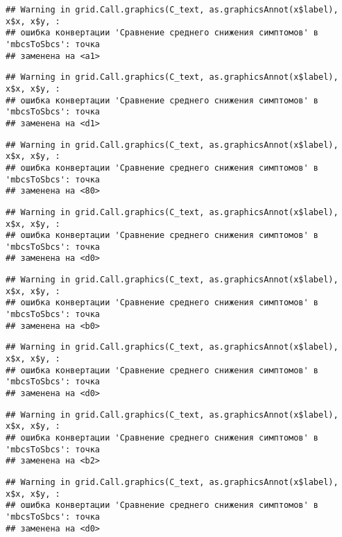 \documentclass[
]{article}
\begin{document}
\begin{verbatim}
## Warning in grid.Call.graphics(C_text, as.graphicsAnnot(x$label), x$x, x$y, :
## ошибка конвертации 'Сравнение среднего снижения симптомов' в 'mbcsToSbcs': точка
## заменена на <a1>
\end{verbatim}

\begin{verbatim}
## Warning in grid.Call.graphics(C_text, as.graphicsAnnot(x$label), x$x, x$y, :
## ошибка конвертации 'Сравнение среднего снижения симптомов' в 'mbcsToSbcs': точка
## заменена на <d1>
\end{verbatim}

\begin{verbatim}
## Warning in grid.Call.graphics(C_text, as.graphicsAnnot(x$label), x$x, x$y, :
## ошибка конвертации 'Сравнение среднего снижения симптомов' в 'mbcsToSbcs': точка
## заменена на <80>
\end{verbatim}

\begin{verbatim}
## Warning in grid.Call.graphics(C_text, as.graphicsAnnot(x$label), x$x, x$y, :
## ошибка конвертации 'Сравнение среднего снижения симптомов' в 'mbcsToSbcs': точка
## заменена на <d0>
\end{verbatim}

\begin{verbatim}
## Warning in grid.Call.graphics(C_text, as.graphicsAnnot(x$label), x$x, x$y, :
## ошибка конвертации 'Сравнение среднего снижения симптомов' в 'mbcsToSbcs': точка
## заменена на <b0>
\end{verbatim}

\begin{verbatim}
## Warning in grid.Call.graphics(C_text, as.graphicsAnnot(x$label), x$x, x$y, :
## ошибка конвертации 'Сравнение среднего снижения симптомов' в 'mbcsToSbcs': точка
## заменена на <d0>
\end{verbatim}

\begin{verbatim}
## Warning in grid.Call.graphics(C_text, as.graphicsAnnot(x$label), x$x, x$y, :
## ошибка конвертации 'Сравнение среднего снижения симптомов' в 'mbcsToSbcs': точка
## заменена на <b2>
\end{verbatim}

\begin{verbatim}
## Warning in grid.Call.graphics(C_text, as.graphicsAnnot(x$label), x$x, x$y, :
## ошибка конвертации 'Сравнение среднего снижения симптомов' в 'mbcsToSbcs': точка
## заменена на <d0>
\end{verbatim}
\end{document}
